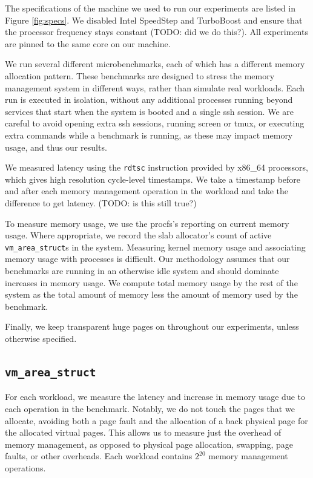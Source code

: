 \documentclass[twocolumn,11pt]{article}
\begin{document}
The specifications of the machine we used to run our experiments are listed in
Figure \ref{fig:specs}. We disabled Intel SpeedStep and TurboBoost and ensure
that the processor frequency stays constant (TODO: did we do this?). All
experiments are pinned to the same core on our machine. 

We run several different microbenchmarks, each of which has a different memory
allocation pattern. These benchmarks are designed to stress the memory
management system in different ways, rather than simulate real workloads. 
Each run is executed in isolation, without any additional processes
running beyond services that start when the system is booted and a single ssh
session. We are careful to avoid opening extra ssh sessions, running screen or
tmux, or executing extra commands while a benchmark is running, as these may
impact memory usage, and thus our results.

We measured latency using the \texttt{rdtsc} instruction provided by x86\_64
processors, which gives high resolution cycle-level timestamps. We take a
timestamp before and after each memory management operation in the workload and
take the difference to get latency. (TODO: is this still true?)

To measure memory usage, we use the procfs's reporting on current memory usage.
Where appropriate, we record the slab allocator's count of active
\texttt{vm\_area\_struct}s in the system. Measuring kernel memory usage and
associating memory usage with processes is difficult. Our methodology assumes
that our benchmarks are running in an otherwise idle system and should dominate
increases in memory usage.  We compute total memory usage by the rest of the
system as the total amount of memory less the amount of memory used by the
benchmark.

Finally, we keep transparent huge pages on throughout our experiments, unless
otherwise specified.

\subsection{\texttt{vm\_area\_struct}}

For each workload, we measure the latency and increase in memory usage due to
each operation in the benchmark. Notably, we do not touch the pages that we
allocate, avoiding both a page fault and the allocation of a back physical page
for the allocated virtual pages. This allows us to measure just the overhead of
memory management, as opposed to physical page allocation, swapping, page
faults, or other overheads.  Each workload contains $2^{20}$ memory management
operations.
\end{document}
